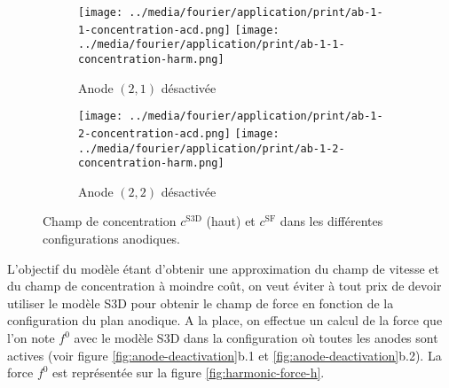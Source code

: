 \begin{figure}[h]
  \begin{center}
    \begin{subfigure}[t]{\textwidth}
      \begin{center}
        \texttt{[image: ../media/fourier/application/print/ab-1-1-concentration-acd.png]}
        \texttt{[image: ../media/fourier/application/print/ab-1-1-concentration-harm.png]}
        \caption{Anode $(2,1)$ désactivée}
        \label{fig:}
      \end{center}
    \end{subfigure}

    \begin{subfigure}[t]{\textwidth}
      \begin{center}
        \texttt{[image: ../media/fourier/application/print/ab-1-2-concentration-acd.png]}
        \texttt{[image: ../media/fourier/application/print/ab-1-2-concentration-harm.png]}
        \caption{Anode $(2,2)$ désactivée}
        \label{fig:}
      \end{center}
    \end{subfigure}


    \caption{Champ de concentration $c^\mathrm{S3D}$ (haut) et
      $c^\mathrm{SF}$ dans les différentes configurations anodiques.}

    \label{fig:harmonic-concentration-comp-b}
  \end{center}
\end{figure}

L'objectif du modèle étant d'obtenir une approximation du champ de
vitesse et du champ de concentration à moindre coût, on veut éviter à
tout prix de devoir utiliser le modèle S3D pour obtenir le champ de
force en fonction de la configuration du plan anodique. A la place, on
effectue un calcul de la force que l'on note $f^0$ avec le modèle S3D
dans la configuration où toutes les anodes sont actives (voir figure
\ref{fig:anode-deactivation}b.1 et
\ref{fig:anode-deactivation}b.2). La force $f^0$ est représentée sur
la figure \ref{fig:harmonic-force-h}.

